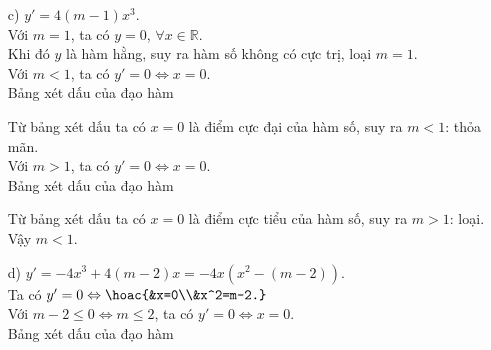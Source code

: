 \begin{vd}
{\begin{enumerate}
\begin{center}
\end{center}
Từ bảng xét dấu ta có $x=1$ là điểm cực đại của hàm số.\\
Vậy $m=2$.
\item[c)] $y'=4(m-1)x^3$. \\
Với $m=1$, ta có $y=0$, $\forall x\in\mathbb{R}$. \\
Khi đó $y$ là hàm hằng, suy ra hàm số không có cực trị, loại $m=1$. \\
Với $m<1$, ta có $y'=0\Leftrightarrow x=0$. \\
Bảng xét dấu của đạo hàm
\begin{center}
\end{center}
Từ bảng xét dấu ta có $x=0$ là điểm cực đại của hàm số, suy ra $m<1$: thỏa mãn. \\
Với $m>1$, ta có $y'=0\Leftrightarrow x=0$. \\
Bảng xét dấu của đạo hàm
\begin{center}
\end{center}
Từ bảng xét dấu ta có $x=0$ là điểm cực tiểu của hàm số, suy ra $m>1$: loại. \\
Vậy $m<1$.
\item[d)] $y'=-4x^3+4(m-2)x=-4x\left(x^2-(m-2)\right)$. \\
Ta có $y'=0\Leftrightarrow\hoac{&x=0\\&x^2=m-2.}$ \\
Với $m-2\leq0\Leftrightarrow m\leq2$, ta có $y'=0\Leftrightarrow x=0$. \\
Bảng xét dấu của đạo hàm
\begin{center}
\end{center}

\end{enumerate}}
\end{vd}
